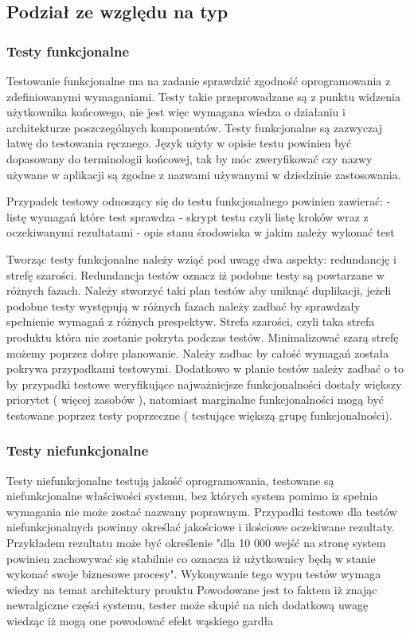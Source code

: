 \subsection{Podział ze względu na typ}
\subsubsection{Testy funkcjonalne}
Testowanie funkcjonalne ma na zadanie sprawdzić zgodność oprogramowania z zdefiniowanymi wymaganiami. Testy takie przeprowadzane są z punktu widzenia użytkownika końcowego, nie jest więc wymagana wiedza o działaniu i architekturze poszczególnych komponentów. Testy funkcjonalne są  zazwyczaj łatwę do testowania ręcznego. Język użyty w opisie testu powinien być dopasowany do terminologii końcowej, tak by móc zweryfikować czy nazwy używane w aplikacji są zgodne z nazwami używanymi w dziedzinie zastosowania.

Przypadek testowy odnoszący się do testu funkcjonalnego powinien zawierać:
- listę wymagań które test sprawdza
- skrypt testu czyli listę kroków wraz z oczekiwanymi rezultatami
- opis stanu środowiska w jakim należy wykonać test

Tworząc testy funkcjonalne należy wziąć pod uwagę dwa aspekty: redundancję i strefę szarości. Redundancja testów oznacz iż podobne testy są powtarzane w różnych fazach. Należy stworzyć taki plan testów aby uniknąć duplikacji, jeżeli podobne testy występują w różnych fazach należy zadbać by sprawdzały spełnienie wymagań z różnych prespektyw. Strefa szarości, czyli taka strefa produktu która nie zostanie pokryta podczas testów. Minimalizować szarą strefę możemy poprzez dobre planowanie. Należy zadbac by całość wymagań została pokrywa przypadkami testowymi. Dodatkowo w planie testów należy zadbać o to by przypadki testowe weryfikujące najważniejsze funkcjonalności dostały większy priorytet ( więcej zasobów ), natomiast marginalne funkcjonalności mogą być testowane poprzez testy poprzeczne ( testujące większą grupę funkcjonalności).
\subsubsection{Testy niefunkcjonalne}
Testy niefunkcjonalne testują jakość oprogramowania, testowane są  niefunkcjonalne właściwości systemu, bez których system pomimo iz spełnia wymagania nie może zostać nazwany poprawnym. Przypadki testowe dla testów niefunkcjonalnych powinny określać jakościowe i ilościowe oczekiwane rezultaty. Przykładem rezultatu może być określenie "dla 10 000 wejść na stronę system powinien zachowywać się stabilnie co oznacza iż użytkownicy będą w stanie wykonać swoje biznesowe procesy". Wykonywanie tego wypu testów wymaga wiedzy na temat architektury prouktu Powodowane jest to faktem iż znając newralgiczne części systemu, tester może skupić na nich dodatkową uwagę wiedząc iż mogą one powodować efekt wąskiego gardła


